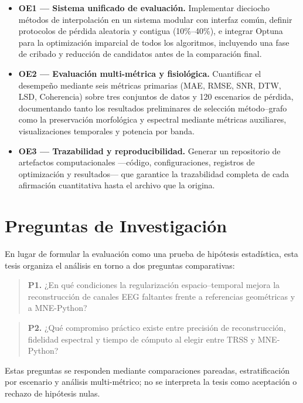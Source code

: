 \begin{itemize}
  \item \textbf{OE1 — Sistema unificado de evaluación.} Implementar dieciocho métodos de interpolación en un sistema modular con interfaz común, definir protocolos de pérdida aleatoria y contigua (10\%--40\%), e integrar Optuna para la optimización imparcial de todos los algoritmos, incluyendo una fase de cribado y reducción de candidatos antes de la comparación final.

  \item \textbf{OE2 — Evaluación multi-métrica y fisiológica.} Cuantificar el desempeño mediante seis métricas primarias (MAE, RMSE, SNR, DTW, LSD, Coherencia) sobre tres conjuntos de datos y 120 escenarios de pérdida, documentando tanto los resultados preliminares de selección método--grafo como la preservación morfológica y espectral mediante métricas auxiliares, visualizaciones temporales y potencia por banda.

  \item \textbf{OE3 — Trazabilidad y reproducibilidad.} Generar un repositorio de artefactos computacionales —código, configuraciones, registros de optimización y resultados— que garantice la trazabilidad completa de cada afirmación cuantitativa hasta el archivo que la origina.
\end{itemize}

\section{Preguntas de Investigación}

En lugar de formular la evaluación como una prueba de hipótesis estadística, esta tesis organiza el análisis en torno a dos preguntas comparativas:

\begin{quote}
\textbf{P1.} ¿En qué condiciones la regularización espacio--temporal mejora la reconstrucción de canales EEG faltantes frente a referencias geométricas y a MNE-Python?
\end{quote}

\begin{quote}
\textbf{P2.} ¿Qué compromiso práctico existe entre precisión de reconstrucción, fidelidad espectral y tiempo de cómputo al elegir entre TRSS y MNE-Python?
\end{quote}

Estas preguntas se responden mediante comparaciones pareadas, estratificación por escenario y análisis multi-métrico; no se interpreta la tesis como aceptación o rechazo de hipótesis nulas.
